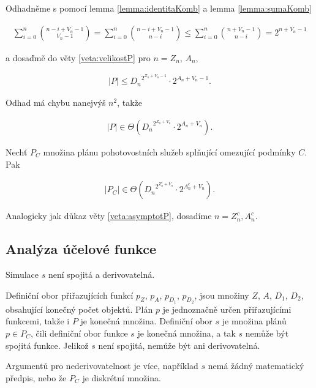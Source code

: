 \begin{dukaz}
  Odhadněme s pomocí lemma \ref{lemma:identitaKomb} a lemma \ref{lemma:sumaKomb}

  \begin{align*}
    \sum_{i=0}^{n} \binom{n - i + V_n - 1}{V_n - 1} =
    \sum_{i=0}^{n} \binom{n - i + V_n - 1}{n - i} \leq
    \sum_{i=0}^{n} \binom{n + V_n - 1}{n - i} =
    2^{n + V_n - 1}
  \end{align*}

  a dosaďmě do věty \ref{veta:velikostP} pro $n = Z_n$, $A_n$,

  \begin{align*}
    |P| \leq {D_n}^{2^{Z_n + V_n - 1}} \cdot 2^{A_n + V_n - 1}.
  \end{align*}

  Odhad má chybu nanejvýš $n^2$, takže
  
  \begin{align*}
    |P| \in \Theta({D_n}^{2^{Z_n + V_n}} \cdot 2^{A_n + V_n}).
  \end{align*}
\end{dukaz}

\begin{veta}
  Nechť $P_C$ množina plánu pohotovostních služeb splňující omezující podmínky $C$. Pak 

  \begin{align*}
    |P_C| \in \Theta({D_n}^{2^{Z^c_n + V_n}} \cdot 2^{A^c_n + V_n}).
  \end{align*}
\end{veta}

\begin{dukaz}
  Analogicky jak důkaz věty \ref{veta:asymptotP}, dosadíme $n = Z^c_n, A^c_n$.
\end{dukaz}

\subsection{Analýza účelové funkce}\label{kap:analVicF}

\begin{veta}\label{veta:vlastnostiSim}
  Simulace $s$ není spojitá a derivovatelná.
\end{veta}

\begin{dukaz}
  Definiční obor přiřazujících funkcí $p_Z$, $p_A$, $p_{D_{1}}$, $p_{D_{2}}$, jsou množiny $Z$, $A$, $D_1$, $D_2$, obsahující konečný počet objektů.
  Plán $p$ je jednoznačně určen přiřazujícími funkcemi, takže i $P$ je konečná množina.
  Definiční obor $s$ je množina plánů $p \in P_C$, čili definiční obor funkce $s$ je konečná množina, a tak $s$ nemůže být spojitá funkce.
  Jelikož $s$ není spojitá, nemůže být ani derivovatelná.

  Argumentů pro nederivovatelnost je více, například $s$ nemá žádný matematický předpis, nebo že $P_C$ je diskrétní množina.
\end{dukaz}

